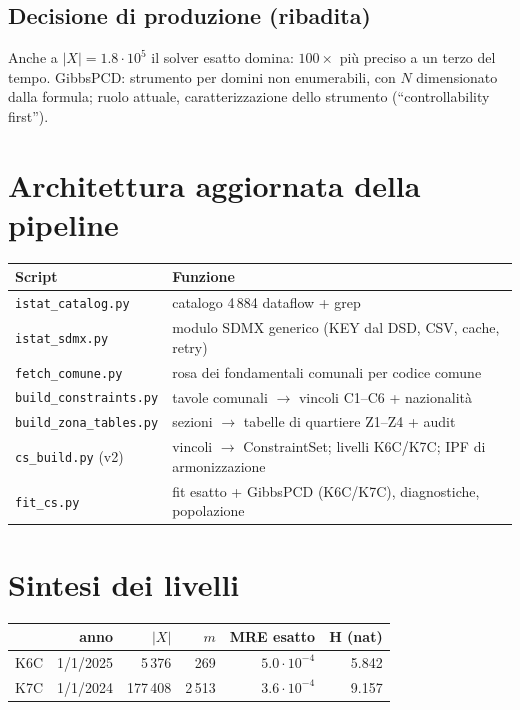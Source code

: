\documentclass[11pt,a4paper]{article}
\newcommand{\code}[1]{\texttt{#1}}
\begin{document}
\subsection{Decisione di produzione (ribadita)}
Anche a $|X|=1.8\cdot10^5$ il solver esatto domina: $100\times$ pi\`u preciso
a un terzo del tempo. GibbsPCD: strumento per domini non enumerabili,
con $N$ dimensionato dalla formula; ruolo attuale, caratterizzazione dello
strumento (``controllability first'').

\section{Architettura aggiornata della pipeline}
\begin{center}
\begin{tabular}{@{}lp{9.4cm}@{}}
\toprule
\textbf{Script} & \textbf{Funzione}\\
\midrule
\code{istat\_catalog.py} & catalogo 4\,884 dataflow + grep\\
\code{istat\_sdmx.py} & modulo SDMX generico (KEY dal DSD, CSV, cache, retry)\\
\code{fetch\_comune.py} & rosa dei fondamentali comunali per codice comune\\
\code{build\_constraints.py} & tavole comunali $\to$ vincoli C1--C6 + nazionalit\`a\\
\code{build\_zona\_tables.py} & sezioni $\to$ tabelle di quartiere Z1--Z4 + audit\\
\code{cs\_build.py} (v2) & vincoli $\to$ ConstraintSet; livelli K6C/K7C; IPF di armonizzazione\\
\code{fit\_cs.py} & fit esatto + GibbsPCD (K6C/K7C), diagnostiche, popolazione\\
\bottomrule
\end{tabular}
\end{center}

\section{Sintesi dei livelli}
\begin{center}
\small
\begin{tabular}{@{}lrrrrr@{}}
\toprule
 & \textbf{anno} & $|X|$ & $m$ & \textbf{MRE esatto} & \textbf{H (nat)}\\
\midrule
K6C & 1/1/2025 & 5\,376 & 269 & $5.0\cdot10^{-4}$ & 5.842\\
K7C & 1/1/2024 & 177\,408 & 2\,513 & $3.6\cdot10^{-4}$ & 9.157\\
\bottomrule
\end{tabular}
\end{center}
\end{document}
